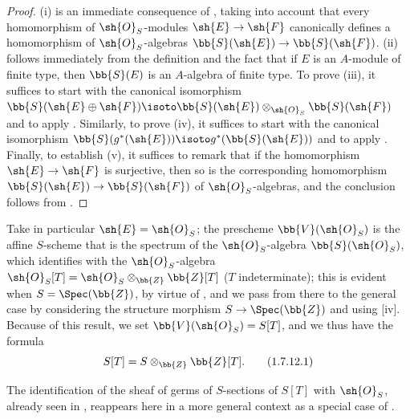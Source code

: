\begin{proof}
(i) is an immediate consequence of , taking into account that every homomorphism of $\sh{O}_S$-modules $\sh{E}\to\sh{F}$ canonically defines a homomorphism of $\sh{O}_S$-algebras $\bb{S}(\sh{E})\to\bb{S}(\sh{F})$.
(ii) follows immediately from the definition  and the fact that if $E$ is an $A$-module of finite type, then $\bb{S}(E)$ is an $A$-algebra of finite type.
To prove (iii), it suffices to start with the canonical isomorphism $\bb{S}(\sh{E}\oplus\sh{F})\isoto\bb{S}(\sh{E})\otimes_{\sh{O}_S}\bb{S}(\sh{F})$  and to apply .
Similarly, to prove (iv), it suffices to start with the canonical isomorphism $\bb{S}(g^*(\sh{E}))\isoto g^*(\bb{S}(\sh{E}))$  and to apply .
Finally, to establish (v), it suffices to remark that if the homomorphism $\sh{E}\to\sh{F}$ is surjective, then so is the corresponding homomorphism $\bb{S}(\sh{E})\to\bb{S}(\sh{F})$ of $\sh{O}_S$-algebras, and the conclusion follows from .
\end{proof}

\begin{env}[1.7.12]
\label{II.1.7.12}
Take in particular $\sh{E}=\sh{O}_S$; the prescheme $\bb{V}(\sh{O}_S)$ is the affine $S$-scheme that is the spectrum of the $\sh{O}_S$-algebra $\bb{S}(\sh{O}_S)$, which identifies with the $\sh{O}_S$-algebra $\sh{O}_S[T]=\sh{O}_S\otimes_\bb{Z}\bb{Z}[T]$
($T$ indeterminate); this is evident when $S=\Spec(\bb{Z})$, by virtue of , and we pass from there to the general case by considering the structure morphism $S\to\Spec(\bb{Z})$ and using [iv].
Because of this result, we set $\bb{V}(\sh{O}_S)=S[T]$, and we thus have the formula
\[
\label{II.1.7.12.1}
  S[T]=S\otimes_\bb{Z}\bb{Z}[T].
  \tag{1.7.12.1}
\]

The identification of the sheaf of germs of $S$-sections of $S[T]$ with $\sh{O}_S$, already seen in , reappears here in a more general context as a special case of .
\end{env}

